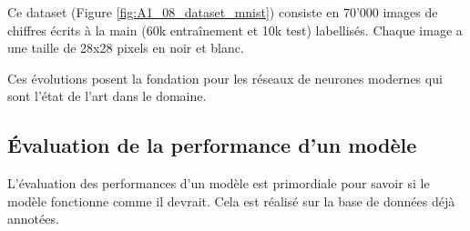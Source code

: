 Ce dataset (Figure \ref{fig:A1_08_dataset_mnist}) consiste en 70'000 images de chiffres écrits à la main (60k entraînement et 10k test) labellisés. Chaque image a une taille de 28x28 pixels en noir et blanc.

Ces évolutions posent la fondation pour les réseaux de neurones modernes qui sont l'état de l'art dans le domaine.

\subsection{Évaluation de la performance d'un modèle}

L'évaluation des performances d'un modèle est primordiale pour savoir si le modèle fonctionne comme il devrait. Cela est réalisé sur la base de données déjà annotées.

